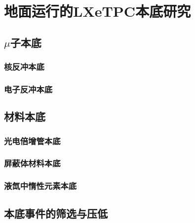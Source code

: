 
\chapter{地面运行的LXeTPC本底研究}

\section{$\mu$子本底}

\subsection{核反冲本底}

\subsection{电子反冲本底}

\section{材料本底}

\subsection{光电倍增管本底}

\subsection{屏蔽体材料本底}

\subsection{液氙中惰性元素本底}

\section{本底事件的筛选与压低}
